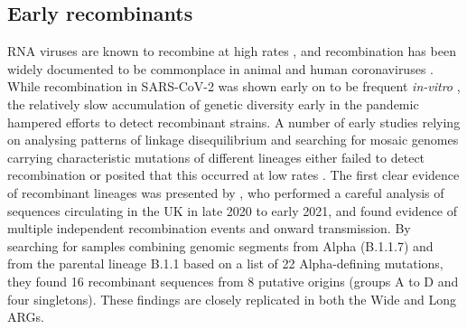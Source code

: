 \documentclass{article}
\begin{document}
\subsection{Early recombinants}
\label{sec:jackson_recombs}
RNA viruses are known to recombine at high rates
\citep{Simon2011-rna}, and recombination has been widely
documented to be commonplace in animal and human coronaviruses
\citep{Su2016-epidemiology}. While recombination in SARS-CoV-2
was shown early on to be frequent \emph{in-vitro}
\citep{Gribble2021-coronavirus}, the relatively slow accumulation
of genetic diversity early in the pandemic hampered efforts to
detect recombinant strains. A number of early studies relying on
analysing patterns of linkage disequilibrium and searching for
mosaic genomes carrying characteristic mutations of different
lineages either failed to detect recombination or posited
that this occurred at low rates \citep[e.g.,~][]{Nie2020-phylogenetic,Tang2020-origin,VanInsberghe2021-eu,Varabyou2021-rw}.
The first clear evidence of recombinant lineages was presented by
\citet{Jackson2021-ik}, who performed a careful analysis of sequences
circulating in the UK in late 2020 to early 2021, and found
evidence of multiple independent recombination events and onward
transmission.
By searching for samples combining genomic segments from Alpha (B.1.1.7) and
from the parental lineage B.1.1 based on a list of 22 Alpha-defining mutations,
they found 16 recombinant sequences from 8 putative
origins (groups A to D and four singletons).
These findings are closely replicated in both the Wide and Long ARGs.
\end{document}
